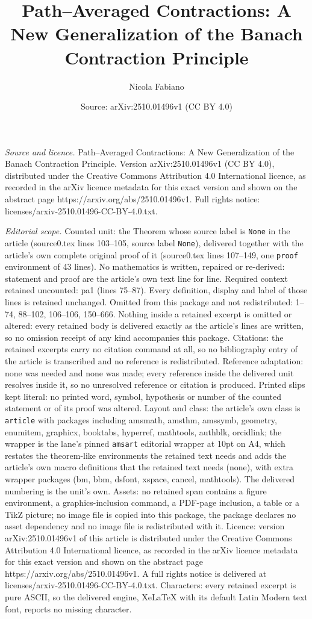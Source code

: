 \documentclass[10pt,a4paper]{amsart}
\title[Path--Averaged Contractions: A New Generalization of the Ban]{Path--Averaged Contractions: A New Generalization of the Banach Contraction Principle}
\author{Nicola Fabiano}
\date{Source: arXiv:2510.01496v1 (CC BY 4.0)}
\begin{document}
\maketitle

\noindent\emph{Source and licence.} Path--Averaged Contractions: A New Generalization of the Banach Contraction Principle. Version arXiv:2510.01496v1 (CC BY 4.0), distributed under the Creative Commons Attribution 4.0 International licence, as recorded in the arXiv licence metadata for this exact version and shown on the abstract page https://arxiv.org/abs/2510.01496v1. Full rights notice: licenses/arxiv-2510.01496-CC-BY-4.0.txt.\par\smallskip

\noindent\textit{Editorial scope.} Counted unit: the Theorem whose source label is \texttt{None} in the article (source0.tex lines 103--105, source label \texttt{None}), delivered together with the article's own complete original proof of it (source0.tex lines 107--149, one \texttt{proof} environment of 43 lines). No mathematics is written, repaired or re-derived: statement and proof are the article's own text line for line. Required context retained uncounted: pa1 (lines 75--87). Every definition, display and label of those lines is retained unchanged. Omitted from this package and not redistributed: 1--74, 88--102, 106--106, 150--666. Nothing inside a retained excerpt is omitted or altered: every retained body is delivered exactly as the article's lines are written, so no omission receipt of any kind accompanies this package. Citations: the retained excerpts carry no citation command at all, so no bibliography entry of the article is transcribed and no reference is redistributed. Reference adaptation: none was needed and none was made; every reference inside the delivered unit resolves inside it, so no unresolved reference or citation is produced. Printed slips kept literal: no printed word, symbol, hypothesis or number of the counted statement or of its proof was altered. Layout and class: the article's own class is \texttt{article} with packages including amsmath, amsthm, amssymb, geometry, enumitem, graphicx, booktabs, hyperref, mathtools, authblk, orcidlink; the wrapper is the lane's pinned \texttt{amsart} editorial wrapper at 10pt on A4, which restates the theorem-like environments the retained text needs and adds the article's own macro definitions that the retained text needs (none), with extra wrapper packages (bm, bbm, dsfont, xspace, cancel, mathtools). The delivered numbering is the unit's own. Assets: no retained span contains a figure environment, a graphics-inclusion command, a PDF-page inclusion, a table or a TikZ picture; no image file is copied into this package, the package declares no asset dependency and no image file is redistributed with it. Licence: version arXiv:2510.01496v1 of this article is distributed under the Creative Commons Attribution 4.0 International licence, as recorded in the arXiv licence metadata for this exact version and shown on the abstract page https://arxiv.org/abs/2510.01496v1. A full rights notice is delivered at licenses/arxiv-2510.01496-CC-BY-4.0.txt. Characters: every retained excerpt is pure ASCII, so the delivered engine, XeLaTeX with its default Latin Modern text font, reports no missing character.
\end{document}

